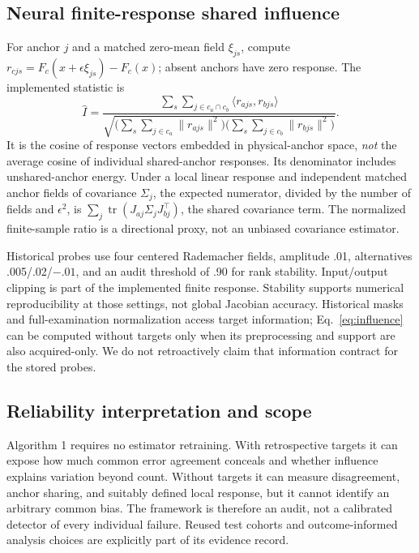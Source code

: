 \documentclass[10pt,twocolumn,letterpaper]{article}
\begin{document}
\subsection{Neural finite-response shared influence}
For anchor $j$ and a matched zero-mean field $\xi_{js}$, compute $r_{cjs}=F_c(x+\epsilon\xi_{js})-F_c(x)$; absent anchors have zero response. The implemented statistic is
\begin{equation}
\widehat I=
\frac{\sum_s\sum_{j\in c_a\cap c_b}\langle r_{ajs},r_{bjs}\rangle}
{\sqrt{\bigl(\sum_s\sum_{j\in c_a}\|r_{ajs}\|^2\bigr)
\bigl(\sum_s\sum_{j\in c_b}\|r_{bjs}\|^2\bigr)}}.\label{eq:influence}
\end{equation}
It is the cosine of response vectors embedded in physical-anchor space, \emph{not} the average cosine of individual shared-anchor responses. Its denominator includes unshared-anchor energy. Under a local linear response and independent matched anchor fields of covariance $\Sigma_j$, the expected numerator, divided by the number of fields and $\epsilon^2$, is $\sum_j\operatorname{tr}(J_{aj}\Sigma_jJ_{bj}^\top)$, the shared covariance term. The normalized finite-sample ratio is a directional proxy, not an unbiased covariance estimator.

Historical probes use four centered Rademacher fields, amplitude .01, alternatives .005/.02/$-.01$, and an audit threshold of .90 for rank stability. Input/output clipping is part of the implemented finite response. Stability supports numerical reproducibility at those settings, not global Jacobian accuracy. Historical masks and full-examination normalization access target information; Eq.~\ref{eq:influence} can be computed without targets only when its preprocessing and support are also acquired-only. We do not retroactively claim that information contract for the stored probes.

\subsection{Reliability interpretation and scope}
Algorithm 1 requires no estimator retraining. With retrospective targets it can expose how much common error agreement conceals and whether influence explains variation beyond count. Without targets it can measure disagreement, anchor sharing, and suitably defined local response, but it cannot identify an arbitrary common bias. The framework is therefore an audit, not a calibrated detector of every individual failure. Reused test cohorts and outcome-informed analysis choices are explicitly part of its evidence record.
\end{document}
